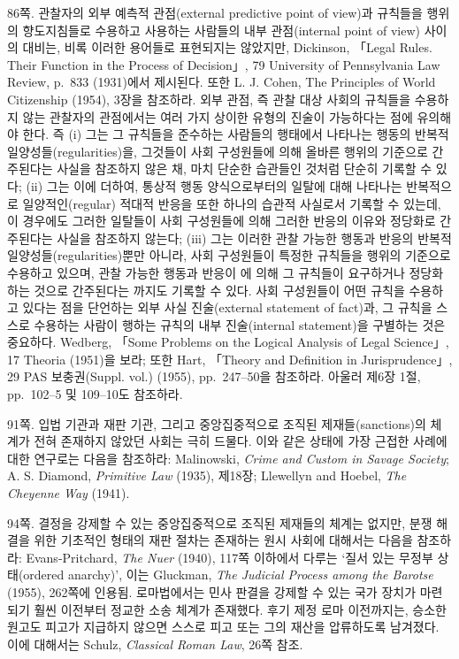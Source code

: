 {\noteentry 86쪽.  관찰자의 외부
예측적 관점(external predictive point of view)과 규칙들을 행위의
향도지침들로 수용하고 사용하는 사람들의 내부 관점(internal point of
view) 사이의 대비는, 비록 이러한 용어들로 표현되지는 않았지만,
Dickinson, 「Legal Rules. Their Function in the Process of Decision」,
79 University of Pennsylvania Law Review, p.~833 (1931)에서 제시된다.
또한 L. J. Cohen, The Principles of World Citizenship (1954), 3장을
참조하라. 외부 관점, 즉 관찰 대상 사회의 규칙들을 수용하지 않는 관찰자의
관점에서는 여러 가지 상이한 유형의 진술이 가능하다는 점에 유의해야 한다.
즉 (i) 그는 그 규칙들을 준수하는 사람들의 행태에서 나타나는 행동의
반복적 일양성들(regularities)을, 그것들이 사회 구성원들에 의해 올바른
행위의 기준으로 간주된다는 사실을 참조하지 않은 채, 마치 단순한 습관들인
것처럼 단순히 기록할 수 있다; (ii) 그는 이에 더하여, 통상적 행동
양식으로부터의 일탈에 대해 나타나는 반복적으로 일양적인(regular) 적대적
반응을 또한 하나의 습관적 사실로서 기록할 수 있는데, 이 경우에도 그러한
일탈들이 사회 구성원들에 의해 그러한 반응의 이유와 정당화로 간주된다는
사실을 참조하지 않는다; (iii) 그는 이러한 관찰 가능한 행동과 반응의
반복적 일양성들(regularities)뿐만 아니라, 사회 구성원들이 특정한
규칙들을 행위의 기준으로 수용하고 있으며, 관찰 가능한 행동과 반응이
에 의해 그 규칙들이 요구하거나 정당화하는 것으로
간주된다는 까지도 기록할 수 있다. 사회
구성원들이 어떤 규칙을 수용하고 있다는 점을 단언하는 외부 사실
진술(external statement of fact)과, 그 규칙을 스스로 수용하는 사람이
행하는 규칙의 내부 진술(internal statement)을 구별하는 것은 중요하다.
Wedberg, 「Some Problems on the Logical Analysis of Legal Science」, 17
Theoria (1951)을 보라; 또한 Hart, 「Theory and Definition in
Jurisprudence」, 29 PAS 보충권(Suppl. vol.) (1955), pp.~247--50을
참조하라. 아울러 제6장 1절, pp.~102--5 및 109--10도 참조하라.

\noteentry 91쪽.  입법 기관과
재판 기관, 그리고 중앙집중적으로 조직된 제재들(sanctions)의 체계가 전혀
존재하지 않았던 사회는 극히 드물다. 이와 같은 상태에 가장 근접한 사례에
대한 연구로는 다음을 참조하라: Malinowski, \emph{Crime and Custom in
Savage Society}; A. S. Diamond, \emph{Primitive Law} (1935), 제18장;
Llewellyn and Hoebel, \emph{The Cheyenne Way} (1941).

\noteentry 94쪽.  결정을 강제할 수 있는 중앙집중적으로 조직된
제재들의 체계는 없지만, 분쟁 해결을 위한 기초적인 형태의 재판 절차는
존재하는 원시 사회에 대해서는 다음을 참조하라: Evans-Pritchard,
\emph{The Nuer} (1940), 117쪽 이하에서 다루는 ‘질서 있는 무정부
상태(ordered anarchy)’, 이는 Gluckman, \emph{The Judicial Process among
the Barotse} (1955), 262쪽에 인용됨. 로마법에서는 민사 판결을 강제할 수
있는 국가 장치가 마련되기 훨씬 이전부터 정교한 소송 체계가 존재했다.
후기 제정 로마 이전까지는, 승소한 원고도 피고가 지급하지 않으면 스스로
피고 또는 그의 재산을 압류하도록 남겨졌다. 이에 대해서는 Schulz,
\emph{Classical Roman Law}, 26쪽 참조.

}
